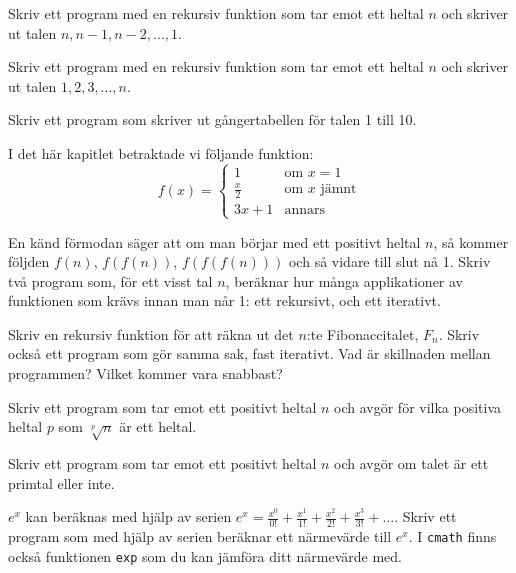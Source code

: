 \begin{exercise}
Skriv ett program med en rekursiv funktion som tar emot ett heltal $n$ och skriver ut talen $n, n-1, n-2, ..., 1$.
\end{exercise}
\begin{exercise}
Skriv ett program med en rekursiv funktion som tar emot ett heltal $n$ och skriver ut talen $1, 2, 3, ..., n$.
\end{exercise}
\begin{exercise}
Skriv ett program som skriver ut gångertabellen för talen 1 till 10.
\end{exercise}
\begin{exercise}
I det här kapitlet betraktade vi följande funktion:
$$
f(x) =
\left\{
    \begin{array}{lll}
        1 & \mbox{om } x = 1\\
        \frac{x}{2} & \mbox{om } x \mbox{ jämnt}\\
        3x+1 & \mbox{annars}
    \end{array}
\right.
$$

En känd förmodan säger att om man börjar med ett positivt heltal $n$, så kommer följden $f(n)$, $f(f(n))$, $f(f(f(n)))$ och så vidare till slut nå 1. Skriv två program som, för ett visst tal $n$, beräknar hur många applikationer av funktionen som krävs innan man når 1: ett rekursivt, och ett iterativt.
\end{exercise}
\begin{exercise}
Skriv en rekursiv funktion för att räkna ut det $n$:te Fibonaccitalet, $F_n$. Skriv också ett program som gör samma sak, fast iterativt. Vad är skillnaden mellan programmen? Vilket kommer vara snabbast?
\end{exercise}
\begin{exercise}
Skriv ett program som tar emot ett positivt heltal $n$ och avgör för vilka positiva heltal $p$ som $\sqrt[p]{n}$ är ett heltal.
\end{exercise}
\begin{exercise}
Skriv ett program som tar emot ett positivt heltal $n$ och avgör om talet är ett primtal eller inte.
\end{exercise}
\begin{exercise}
$e^x$ kan beräknas med hjälp av serien $e^x = \frac{x^0}{0!} + \frac{x^1}{1!} + \frac{x^2}{2!} + \frac{x^3}{3!} + ...$. Skriv ett program som med hjälp av serien beräknar ett närmevärde till $e^x$. I \texttt{cmath} finns också funktionen \texttt{exp} som du kan jämföra ditt närmevärde med.
\end{exercise}